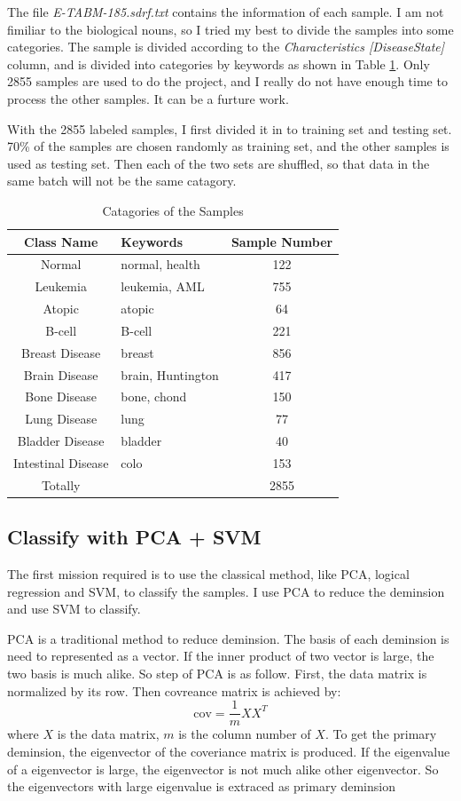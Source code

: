\documentclass[sigchi]{acmart}
\begin{document}
The file \textit {E-TABM-185.sdrf.txt} contains the information of each sample. I am not fimiliar to the biological nouns, so I tried my best to divide the samples into some categories. The sample is divided according to the {\itshape Characteristics [DiseaseState]} column, and is divided into categories by keywords as shown in Table \ref{tab:category}. Only 2855 samples are used to do the project, and I really do not have enough time to process the other samples. It can be a furture work.

With the 2855 labeled samples, I first divided it in to training set and testing set. 70\% of the samples are chosen randomly as training set, and the other samples is used as testing set. Then each of the two sets are shuffled, so that data in the same batch will not be the same catagory.

\begin{table}
  \caption{Catagories of the Samples}
  \label{tab:category}
  \begin{tabular}{clc}
    \toprule
    Class Name & Keywords & Sample Number\\
    \midrule
    Normal & normal, health & 122 \\
    Leukemia & leukemia, AML & 755 \\
    Atopic & atopic & 64 \\
    B-cell & B-cell & 221 \\
    Breast Disease & breast & 856 \\
    Brain Disease & brain, Huntington & 417 \\
    Bone Disease & bone, chond & 150 \\
    Lung Disease & lung & 77 \\
    Bladder Disease & bladder & 40\\
    Intestinal Disease & colo & 153 \\
    \midrule
    Totally & & 2855 \\
  \bottomrule
\end{tabular}
\end{table}
\subsection{Classify with PCA + SVM}

The first mission required is to use the classical method, like PCA, logical regression and SVM, to classify the samples. I use PCA to reduce the deminsion and use SVM to classify. 

PCA is a traditional method to reduce deminsion. The basis of each deminsion is need to represented as a vector. If the inner product of two vector is large, the two basis is much alike. So step of PCA is as follow. First, the data matrix is normalized by its row. Then covreance matrix is achieved by:
\begin{equation}
  \mathrm{cov} = \dfrac{1}{m}XX^T
\end{equation}
where $X$ is the data matrix, $m$ is the column number of $X$. To get the primary deminsion, the eigenvector of the coveriance matrix is produced. If the eigenvalue of a eigenvector is large, the eigenvector is not much alike other eigenvector. So the eigenvectors with large eigenvalue is extraced as primary deminsion
\end{document}
